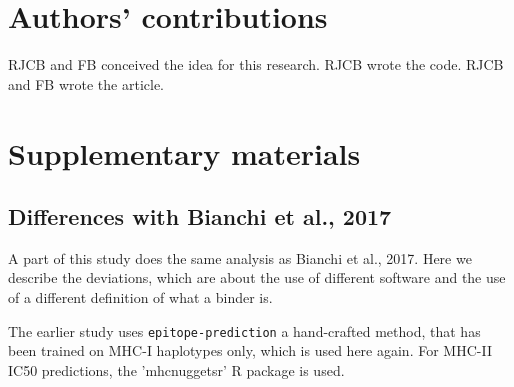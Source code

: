 \section{Authors' contributions}

RJCB and FB conceived the idea for this research. 
RJCB wrote the code.
RJCB and FB wrote the article.





\appendix
\section{Supplementary materials}

\subsection{Differences with Bianchi et al., 2017}

A part of this study does the same analysis as Bianchi et al., 2017.
Here we describe the deviations, which are about the use of different
software and the use of a different definition of what a binder is.




The earlier study uses \verb;epitope-prediction; a hand-crafted method, 
that has been trained on MHC-I haplotypes only,
which is used here again. For MHC-II IC50 predictions, the
'mhcnuggetsr' R package is used.


